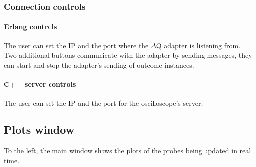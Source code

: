    \subsubsection{Connection controls}
    
        \paragraph{Erlang controls}
            The user can set the IP and the port where the $\Delta$Q adapter is listening from. Two additional buttons communicate with the adapter by sending messages, they can start and stop the adapter's sending of outcome instances.
        
        \paragraph{C++ server controls}
            The user can set the IP and the port for the oscilloscope's server.

\subsection{Plots window}
        To the left, the main window shows the plots of the probes being updated in real time. 
